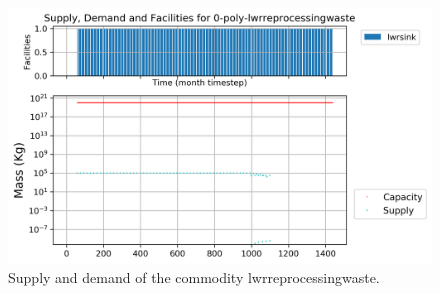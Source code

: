 \documentclass[11pt]{article}
\begin{document}
\begin{figure}[H]
	\centering
	\includegraphics[width=\textwidth]{29-figures/0-poly-lwrreprocessingwaste.png} 
	\hfill
	\caption{Supply and demand of the commodity lwrreprocessingwaste.}
	\label{fig:29-lwrreprocessingwaste}
\end{figure}
\end{document}
